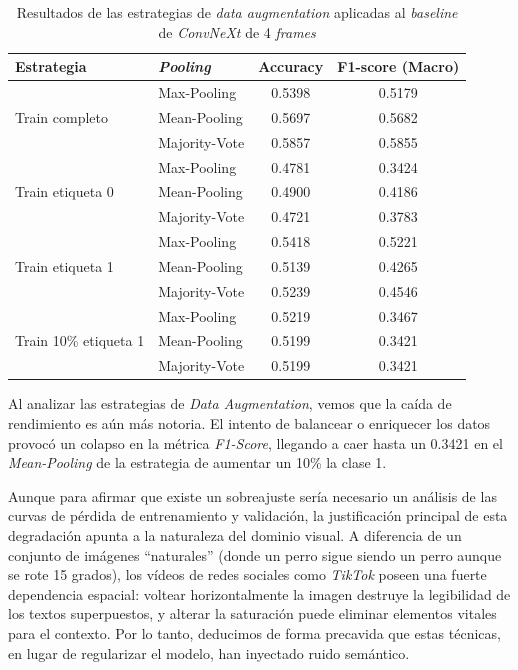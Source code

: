 \begin{table}[H]
    \centering
    \begin{tabular}{llcc}
        \toprule
        \textbf{Estrategia} & \textbf{\textit{Pooling}} & \textbf{Accuracy} & \textbf{F1-score (Macro)} \\
        \midrule
        \multirow{3}{*}{Train completo} 
            & Max-Pooling & 0.5398 & 0.5179 \\
            & Mean-Pooling   & 0.5697 & 0.5682 \\
            & Majority-Vote   & 0.5857 & 0.5855 \\
        \midrule
        \multirow{3}{*}{Train etiqueta 0}
            & Max-Pooling       & 0.4781 & 0.3424 \\
            & Mean-Pooling       & 0.4900 & 0.4186 \\
            & Majority-Vote       & 0.4721 & 0.3783 \\
        \midrule
        \multirow{3}{*}{Train etiqueta 1}
            & Max-Pooling       & 0.5418 & 0.5221 \\
            & Mean-Pooling       & 0.5139 & 0.4265 \\
            & Majority-Vote       & 0.5239 & 0.4546 \\
        \midrule
        \multirow{3}{*}{Train 10\% etiqueta 1}
            & Max-Pooling       & 0.5219 & 0.3467 \\
            & Mean-Pooling       & 0.5199 & 0.3421 \\
            & Majority-Vote       & 0.5199 & 0.3421 \\
        \bottomrule
    \end{tabular}
    \caption{Resultados de las estrategias de \textit{data augmentation} aplicadas al \textit{baseline} de \textit{ConvNeXt} de 4 \textit{frames}}
    \label{tab:DataAugmentationConvNext4Frames}
\end{table}

Al analizar las estrategias de \textit{Data Augmentation}, vemos que la caída de rendimiento es aún más notoria. El intento de balancear o enriquecer los datos provocó un colapso en la métrica \textit{F1-Score}, llegando a caer hasta un 0.3421 en el \textit{Mean-Pooling} de la estrategia de aumentar un 10\% la clase 1.

Aunque para afirmar que existe un sobreajuste sería necesario un análisis de las curvas de pérdida de entrenamiento y validación, la justificación principal  de esta degradación apunta a la naturaleza del dominio visual. A diferencia de un conjunto de imágenes ``naturales'' (donde un perro sigue siendo un perro aunque se rote 15 grados), los vídeos de redes sociales como \textit{TikTok} poseen una fuerte dependencia espacial: voltear horizontalmente la imagen destruye la legibilidad de los textos superpuestos, y alterar la saturación puede eliminar elementos vitales para el contexto. Por lo tanto, deducimos de forma precavida que estas técnicas, en lugar de regularizar el modelo, han inyectado ruido semántico. 

